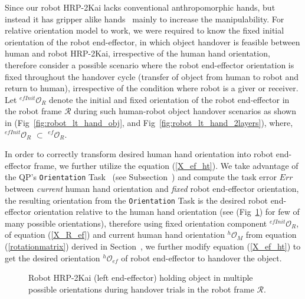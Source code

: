 Since our robot HRP-2Kai lacks conventional anthropomorphic hands, but instead it has gripper alike hands~\cite{kaneko2015humanoid, stasse2019overview} mainly to increase the manipulability. For relative orientation model to work, we were required to know the fixed initial orientation of the robot end-effector, in which object handover is feasible between human and robot HRP-2Kai, irrespective of the human hand orientation, therefore consider a possible  scenario where the robot end-effector orientation is fixed throughout the handover cycle (transfer of object from human to robot and return to human), irrespective of the condition where robot is a giver or receiver. Let ${{}^{efInit}\mathcal{O}_R}$ denote the initial and fixed orientation of the robot end-effector in the robot frame $\mathcal{R}$ during such human-robot object handover scenarios as shown in (Fig~\ref{fig:robot_lt_hand_obj}, and Fig~\ref{fig:robot_lt_hand_2layers}), where, ${{}^{efInit}\mathcal{O}_R}$ $\subset$ ${{}^{ef}\mathcal{O}_R}$.




In order to correctly transform desired human hand orientation into robot end-effector frame, we further utilize the equation (\ref{X_ef_ht}). We take advantage of the QP's \texttt{Orientation} Task~\cite{murray2017mathematical, ladder-HRP-2Kai} (see Subsection~) and compute the task error $Err$ between \textit{current} human hand orientation and \textit{fixed} robot end-effector orientation, the resulting orientation from the \texttt{Orientation} Task is the desired robot end-effector orientation relative to the human hand orientation (see (Fig~\ref{fig:robot_lt_orientations}) for few of many possible orientations), therefore using fixed orientation component  ${{}^{efInit}\mathcal{O}_R}$, of equation (\ref{X_R_ef}) and current human hand orientation ${}^{h}\mathcal{O}_M$ from equation (\ref{rotationmatrix}) derived in Section~, we further modify equation (\ref{X_ef_ht}) to get the desired orientation $ {}^{h}\mathcal{O}_{ef} $ of robot end-effector to handover the object.

\begin{figure}[ht]
	\caption{Robot HRP-2Kai (left end-effector) holding object in multiple possible orientations during handover trials in the robot frame $\mathcal{R}$.}
	\label{fig:robot_lt_orientations}
\end{figure} 


